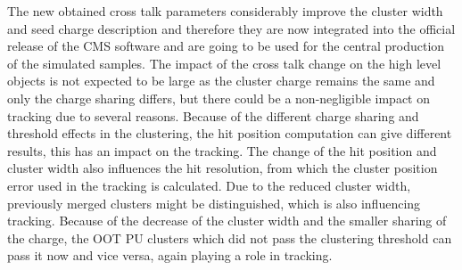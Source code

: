 

The new obtained cross talk parameters considerably improve the cluster width and seed charge description and therefore they are now integrated into the official release of the CMS software and are going to be used for the central production of the simulated samples. The impact of the cross talk change on the high level objects is not expected to be large as the cluster charge remains the same and only the charge sharing differs, but there could be a non-negligible impact on tracking due to several reasons. Because of the different charge sharing and threshold effects in the clustering, the hit position computation can give different results, this has an impact on the tracking. The change of the hit position and cluster width also influences the hit resolution, from which the cluster position error used in the tracking is calculated. Due to the reduced cluster width, previously merged clusters might be distinguished, which is also influencing tracking. Because of the decrease of the cluster width and the smaller sharing of the charge, the OOT PU clusters which did not pass the clustering threshold can pass it now and vice versa, again playing a role in tracking.   




